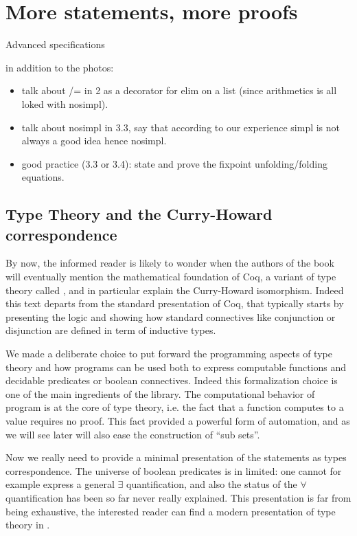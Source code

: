 \chapter{More statements, more proofs}{Advanced specifications}

in addition to the photos:
\begin{itemize}
\item talk about /= in 2 as a decorator for elim on a list (since arithmetics is all loked with nosimpl).
\item talk about nosimpl in 3.3, say that according to our experience simpl is not
always a good idea hence nosimpl.
\item good practice (3.3 or 3.4): state and prove the fixpoint unfolding/folding
equations.
\end{itemize}

\section{Type Theory and the Curry-Howard correspondence}

By now, the informed reader is likely to wonder when the authors of the book
will eventually mention the mathematical foundation of Coq, a variant of 
type theory called \mcbCIC{}, and
in particular explain the Curry-Howard isomorphism.  Indeed this text departs
from the standard presentation of Coq, that typically starts by 
presenting the logic and showing how standard connectives like 
conjunction or disjunction are defined in term of inductive types.

We made a deliberate choice to put forward the programming aspects of
type theory and how programs can be used both to express computable functions
and decidable predicates or boolean connectives.  
Indeed this formalization choice is one of the main ingredients of the \mcbMC{}
library.  The computational behavior of program is at the core of
type theory, i.e. the fact that a function computes to a value requires no
proof.  This fact provided a powerful form of automation, and as we will
see later will also ease the construction of ``sub sets''.

Now we really need to provide a minimal presentation of the statements as types
correspondence.  The universe of boolean predicates is in \mcbMC{} limited: one
cannot for example express a general $\exists$ quantification, and also the
status of the $\forall$ quantification has been so far never really explained.
This presentation is far from being exhaustive, the interested reader can find
a modern presentation of type theory in \cite{hott}.

